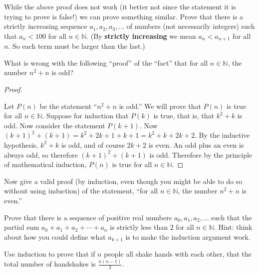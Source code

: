 \documentclass[10pt,]{book}
\newcommand{\terminology}[1]{\textbf{#1}}
\theoremstyle{plain}
\theoremstyle{definition}
\theoremstyle{definition}
\theoremstyle{definition}
\theoremstyle{definition}
\numberwithin{equation}{chapter}
\def\N{\mathbb N}
\newcommand{\lt}{<}
\begin{document}
\begin{divisionexercise}{13}\hypertarget{exercise-268}{}
\hypertarget{p-2307}{}%
While the above proof does not work (it better not since the statement it is trying to prove is false!) we can prove something similar. Prove that there is a strictly increasing sequence \(a_1, a_2, a_3, \ldots\) of numbers (not necessarily integers) such that \(a_n \lt  100\) for all \(n \in \N\). (By \terminology{strictly increasing} we mean \(a_n \lt  a_{n+1}\) for all \(n\). So each term must be larger than the last.)%
\end{divisionexercise}%
\begin{divisionexercise}{14}\hypertarget{exercise-269}{}
\hypertarget{p-2309}{}%
What is wrong with the following ``proof'' of the ``fact'' that for all \(n \in \N\), the number \(n^2 + n\) is odd?%
\begin{proof}\hypertarget{proof-53}{}
\hypertarget{p-2310}{}%
Let \(P(n)\) be the statement ``\(n^2 + n\) is odd.'' We will prove that \(P(n)\) is true for all \(n \in \N\). Suppose for induction that \(P(k)\) is true, that is, that \(k^2 + k\) is odd. Now consider the statement \(P(k+1)\). Now \((k+1)^2 + (k+1) = k^2 + 2k + 1 + k + 1 = k^2 + k + 2k + 2\). By the inductive hypothesis, \(k^2 + k\) is odd, and of course \(2k + 2\) is even. An odd plus an even is always odd, so therefore \((k+1)^2 + (k+1)\) is odd. Therefore by the principle of mathematical induction, \(P(n)\) is true for all \(n \in \N\).%
\end{proof}
\end{divisionexercise}%
\begin{divisionexercise}{15}\hypertarget{exercise-270}{}
\hypertarget{p-2311}{}%
Now give a valid proof (by induction, even though you might be able to do so without using induction) of the statement, ``for all \(n \in \N\), the number \(n^2 + n\) is even.''%
\end{divisionexercise}%
\begin{divisionexercise}{16}\hypertarget{exercise-271}{}
\hypertarget{p-2312}{}%
Prove that there is a sequence of positive real numbers \(a_0, a_1, a_2, \ldots\) such that the partial sum \(a_0 + a_1 + a_2 + \cdots + a_n\) is strictly less than \(2\) for all \(n \in \N\). Hint: think about how you could define what \(a_{k+1}\) is to make the induction argument work.%
\end{divisionexercise}%
\begin{divisionexercise}{17}\hypertarget{exercise-272}{}
\hypertarget{p-2318}{}%
Use induction to prove that if \(n\) people all shake hands with each other, that the total number of handshakes is \(\frac{n(n-1)}{2}\).%
\end{divisionexercise}%
\end{document}
